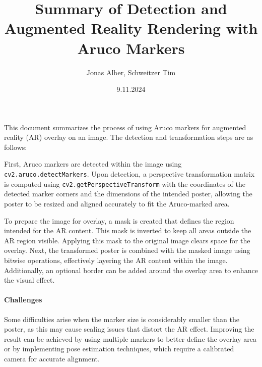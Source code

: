 \documentclass{article}
\begin{document}
\title{Summary of Detection and Augmented Reality Rendering with Aruco Markers}
\author{Jonas Alber, Schweitzer Tim}
\date{9.11.2024}

\maketitle 

\noindent
This document summarizes the process of using Aruco markers for augmented reality (AR) overlay on an image. The detection and transformation steps are as follows:

First, Aruco markers are detected within the image using \texttt{cv2.aruco.detectMarkers}. Upon detection, a perspective transformation matrix is computed using \texttt{cv2.getPerspectiveTransform} with the coordinates of the detected marker corners and the dimensions of the intended poster, allowing the poster to be resized and aligned accurately to fit the Aruco-marked area.

To prepare the image for overlay, a mask is created that defines the region intended for the AR content. This mask is inverted to keep all areas outside the AR region visible. Applying this mask to the original image clears space for the overlay. Next, the transformed poster is combined with the masked image using bitwise operations, effectively layering the AR content within the image. Additionally, an optional border can be added around the overlay area to enhance the visual effect.

\paragraph{Challenges} 
Some difficulties arise when the marker size is considerably smaller than the poster, as this may cause scaling issues that distort the AR effect. Improving the result can be achieved by using multiple markers to better define the overlay area or by implementing pose estimation techniques, which require a calibrated camera for accurate alignment.
\end{document}
